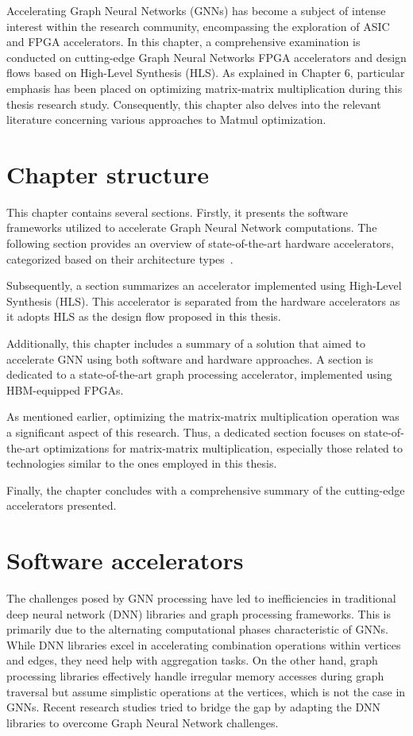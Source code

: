 Accelerating Graph Neural Networks (GNNs) has become a subject of intense interest within the research community, encompassing the exploration of ASIC and FPGA accelerators.
In this chapter, a comprehensive examination is conducted on cutting-edge Graph Neural Networks FPGA accelerators and design flows based on High-Level Synthesis (HLS).
As explained in Chapter 6, particular emphasis has been placed on optimizing matrix-matrix multiplication during this thesis research study.
Consequently, this chapter also delves into the relevant literature concerning various approaches to Matmul optimization.

\section{Chapter structure}
\label{sec:related_work_structure}
This chapter contains several sections.
Firstly, it presents the software frameworks utilized to accelerate Graph Neural Network computations.
The following section provides an overview of state-of-the-art hardware accelerators, categorized based on their architecture types~\cite{DBLP:journals/corr/abs-2010-00130}.

Subsequently, a section summarizes an accelerator implemented using High-Level Synthesis (HLS). This accelerator is separated from the hardware accelerators as it adopts HLS as the design flow proposed in this thesis.

Additionally, this chapter includes a summary of a solution that aimed to accelerate GNN using both software and hardware approaches.
A section is dedicated to a state-of-the-art graph processing accelerator, implemented using HBM-equipped FPGAs.

As mentioned earlier, optimizing the matrix-matrix multiplication operation was a significant aspect of this research.
Thus, a dedicated section focuses on state-of-the-art optimizations for matrix-matrix multiplication, especially those related to technologies similar to the ones employed in this thesis.

Finally, the chapter concludes with a comprehensive summary of the cutting-edge accelerators presented.

\section{Software accelerators}
\label{sec:related_work_software_accelerators}

The challenges posed by GNN processing have led to inefficiencies in traditional deep neural network (DNN) libraries and graph processing frameworks.
This is primarily due to the alternating computational phases characteristic of GNNs.
While DNN libraries excel in accelerating combination operations within vertices and edges, they need help with aggregation tasks.
On the other hand, graph processing libraries effectively handle irregular memory accesses during graph traversal but assume simplistic operations at the vertices, which is not the case in GNNs. Recent research studies tried to bridge the gap by adapting the DNN libraries to overcome Graph Neural Network challenges.

